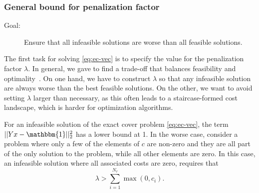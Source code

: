 \documentclass{article}
\begin{document}
\subsubsection{General bound for penalization factor}
\label{sec:ec-orig}
\begin{description}
    \item[Goal:] Ensure that all infeasible solutions are worse than all feasible solutions.
\end{description}
The first task for solving \eqref{eq:ec-vec} is to specify the value for the penalization factor $\lambda$. In general, we gave to find a trade-off that balances feasibility and optimality~\cite{Wang2020-XYmixers}. On one hand, we have to construct $\lambda$ so that any infeasible solution are always worse than the best feasible solutions. On the other, we want to avoid setting $\lambda$ larger than necessary, as this often leads to a staircase-formed cost landscape, which is harder for optimization algorithms. 

For an infeasible solution of the exact cover problem \eqref{eq:ec-vec}, the term $||Y x - \mathbbm{1}||_2^2$ has a lower bound at 1. In the worse case, consider a problem where only a few of the elements of $c$ are non-zero and they are all part of the only solution to the problem, while all other elements are zero. In this case, an infeasible solution where all associated costs are zero, requires that
\begin{equation}
    \lambda > \sum_{i=1}^{N_r} \max(0, c_i).
    \label{eq:lambda-general}
\end{equation}
\end{document}

